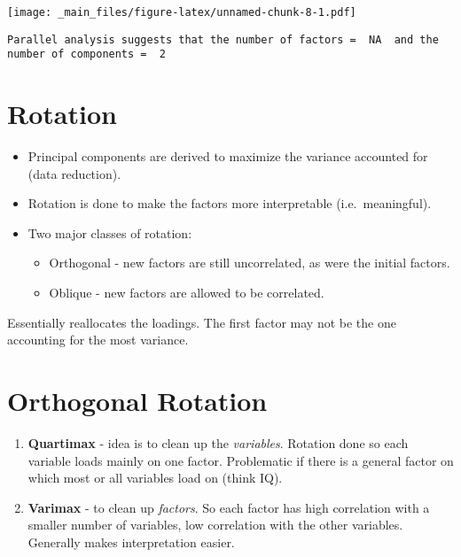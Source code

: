 \documentclass[
]{book}
\providecommand{\tightlist}{%
  \setlength{\itemsep}{0pt}\setlength{\parskip}{0pt}}
\begin{document}
\texttt{[image: \_main\_files/figure-latex/unnamed-chunk-8-1.pdf]}

\begin{verbatim}
Parallel analysis suggests that the number of factors =  NA  and the number of components =  2 
\end{verbatim}

\hypertarget{rotation}{%
\section{Rotation}\label{rotation}}

\begin{itemize}
\tightlist
\item
  Principal components are derived to maximize the variance accounted for (data reduction).
\item
  Rotation is done to make the factors more interpretable (i.e.~meaningful).
\item
  Two major classes of rotation:

  \begin{itemize}
  \tightlist
  \item
    Orthogonal - new factors are still uncorrelated, as were the initial factors.
  \item
    Oblique - new factors are allowed to be correlated.
  \end{itemize}
\end{itemize}

Essentially reallocates the loadings. The first factor may not be the one accounting for the most variance.

\hypertarget{orthogonal-rotation}{%
\section{Orthogonal Rotation}\label{orthogonal-rotation}}

\begin{enumerate}
\def\labelenumi{\arabic{enumi}.}
\item
  \textbf{Quartimax} - idea is to clean up the \emph{variables}. Rotation done so each variable loads mainly on one factor. Problematic if there is a general factor on which most or all variables load on (think IQ).
\item
  \textbf{Varimax} - to clean up \emph{factors}. So each factor has high correlation with a smaller number of variables, low correlation with the other variables. Generally makes interpretation easier.
\end{enumerate}
\end{document}

